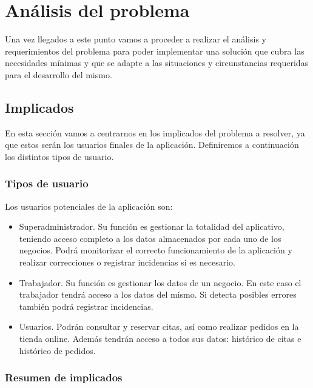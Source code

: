 \chapter{Análisis del problema}

Una vez llegados a este punto vamos a proceder a realizar el análisis y requerimientos \cite{softwareDev} del problema para poder implementar una solución que cubra las necesidades mínimas y que se adapte a las situaciones y circunstancias requeridas para el desarrollo del mismo.

\section{Implicados}

En esta sección vamos a centrarnos en los implicados del problema a resolver, ya que estos serán los usuarios finales de
la aplicación. Definiremos a continuación los distintos tipos de usuario.

\subsection{Tipos de usuario}

Los usuarios potenciales de la aplicación son:

\begin{itemize}
    \item Superadministrador. Su función es gestionar la totalidad del aplicativo, teniendo acceso completo a los datos
    almacenados por cada uno de los negocios. Podrá monitorizar el correcto funcionamiento de la aplicación y realizar
    correcciones o registrar incidencias si es necesario.

    \item Trabajador. Su función es gestionar los datos de un negocio. En este caso el trabajador 
    tendrá acceso a los datos del mismo. Si detecta posibles errores también podrá registrar incidencias.

    \item Usuarios. Podrán consultar y reservar citas, así como realizar pedidos en la tienda online.
    Además tendrán acceso a todos sus datos: histórico de citas e histórico de pedidos.
\end{itemize}

\subsection{Resumen de implicados}

